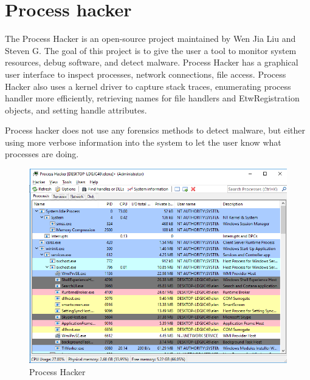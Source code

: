 \section[Process hacker]{Process hacker}

The Process Hacker \cite{processhacker} is an open-source project maintained by
Wen Jia Liu and Steven G. The goal of this project is to give the user a tool
to monitor system resources, debug software, and detect malware. Process Hacker
has a graphical user interface to inspect processes, network connections, file
access. Process Hacker also uses a kernel driver to capture stack traces,
enumerating process handler more efficiently, retrieving names for file
handlers and EtwRegistration objects, and setting handle attributes.

Process hacker does not use any forensics methods to detect malware, but either
using more verbose information into the system to let the user know what
processes are doing.


\begin{figure}[h]
  \centering
  \caption{Process Hacker}
  \label{fig:processhacker}
  \includegraphics[scale=0.7]{images/processhacker.png}
\end{figure}
